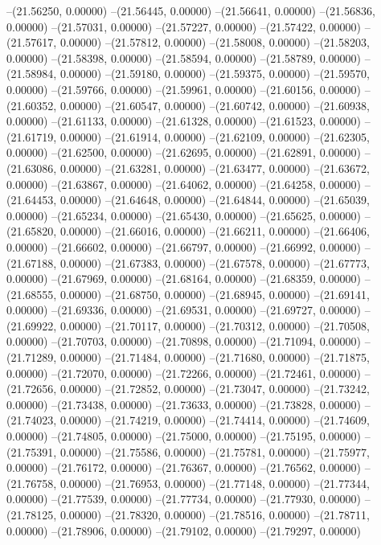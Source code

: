 --(21.56250, 0.00000)
--(21.56445, 0.00000)
--(21.56641, 0.00000)
--(21.56836, 0.00000)
--(21.57031, 0.00000)
--(21.57227, 0.00000)
--(21.57422, 0.00000)
--(21.57617, 0.00000)
--(21.57812, 0.00000)
--(21.58008, 0.00000)
--(21.58203, 0.00000)
--(21.58398, 0.00000)
--(21.58594, 0.00000)
--(21.58789, 0.00000)
--(21.58984, 0.00000)
--(21.59180, 0.00000)
--(21.59375, 0.00000)
--(21.59570, 0.00000)
--(21.59766, 0.00000)
--(21.59961, 0.00000)
--(21.60156, 0.00000)
--(21.60352, 0.00000)
--(21.60547, 0.00000)
--(21.60742, 0.00000)
--(21.60938, 0.00000)
--(21.61133, 0.00000)
--(21.61328, 0.00000)
--(21.61523, 0.00000)
--(21.61719, 0.00000)
--(21.61914, 0.00000)
--(21.62109, 0.00000)
--(21.62305, 0.00000)
--(21.62500, 0.00000)
--(21.62695, 0.00000)
--(21.62891, 0.00000)
--(21.63086, 0.00000)
--(21.63281, 0.00000)
--(21.63477, 0.00000)
--(21.63672, 0.00000)
--(21.63867, 0.00000)
--(21.64062, 0.00000)
--(21.64258, 0.00000)
--(21.64453, 0.00000)
--(21.64648, 0.00000)
--(21.64844, 0.00000)
--(21.65039, 0.00000)
--(21.65234, 0.00000)
--(21.65430, 0.00000)
--(21.65625, 0.00000)
--(21.65820, 0.00000)
--(21.66016, 0.00000)
--(21.66211, 0.00000)
--(21.66406, 0.00000)
--(21.66602, 0.00000)
--(21.66797, 0.00000)
--(21.66992, 0.00000)
--(21.67188, 0.00000)
--(21.67383, 0.00000)
--(21.67578, 0.00000)
--(21.67773, 0.00000)
--(21.67969, 0.00000)
--(21.68164, 0.00000)
--(21.68359, 0.00000)
--(21.68555, 0.00000)
--(21.68750, 0.00000)
--(21.68945, 0.00000)
--(21.69141, 0.00000)
--(21.69336, 0.00000)
--(21.69531, 0.00000)
--(21.69727, 0.00000)
--(21.69922, 0.00000)
--(21.70117, 0.00000)
--(21.70312, 0.00000)
--(21.70508, 0.00000)
--(21.70703, 0.00000)
--(21.70898, 0.00000)
--(21.71094, 0.00000)
--(21.71289, 0.00000)
--(21.71484, 0.00000)
--(21.71680, 0.00000)
--(21.71875, 0.00000)
--(21.72070, 0.00000)
--(21.72266, 0.00000)
--(21.72461, 0.00000)
--(21.72656, 0.00000)
--(21.72852, 0.00000)
--(21.73047, 0.00000)
--(21.73242, 0.00000)
--(21.73438, 0.00000)
--(21.73633, 0.00000)
--(21.73828, 0.00000)
--(21.74023, 0.00000)
--(21.74219, 0.00000)
--(21.74414, 0.00000)
--(21.74609, 0.00000)
--(21.74805, 0.00000)
--(21.75000, 0.00000)
--(21.75195, 0.00000)
--(21.75391, 0.00000)
--(21.75586, 0.00000)
--(21.75781, 0.00000)
--(21.75977, 0.00000)
--(21.76172, 0.00000)
--(21.76367, 0.00000)
--(21.76562, 0.00000)
--(21.76758, 0.00000)
--(21.76953, 0.00000)
--(21.77148, 0.00000)
--(21.77344, 0.00000)
--(21.77539, 0.00000)
--(21.77734, 0.00000)
--(21.77930, 0.00000)
--(21.78125, 0.00000)
--(21.78320, 0.00000)
--(21.78516, 0.00000)
--(21.78711, 0.00000)
--(21.78906, 0.00000)
--(21.79102, 0.00000)
--(21.79297, 0.00000)
